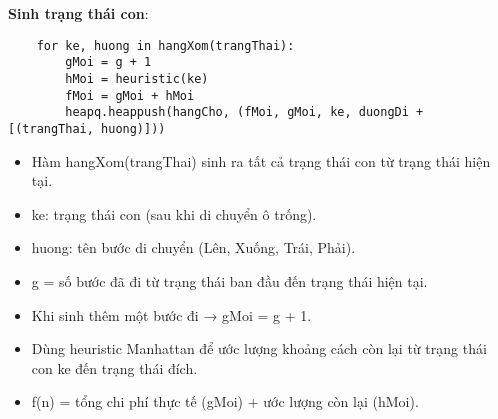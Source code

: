 \documentclass{article}
\begin{document}
\textbf{Sinh trạng thái con}:
\begin{verbatim}
    for ke, huong in hangXom(trangThai):
        gMoi = g + 1
        hMoi = heuristic(ke)
        fMoi = gMoi + hMoi
        heapq.heappush(hangCho, (fMoi, gMoi, ke, duongDi + [(trangThai, huong)]))
\end{verbatim}
\begin{itemize}
    \item Hàm hangXom(trangThai) sinh ra tất cả trạng thái con từ trạng thái hiện tại.
    \item ke: trạng thái con (sau khi di chuyển ô trống).
    \item huong: tên bước di chuyển (Lên, Xuống, Trái, Phải).
    \item g = số bước đã đi từ trạng thái ban đầu đến trạng thái hiện tại.
    \item Khi sinh thêm một bước đi → gMoi = g + 1.
    \item Dùng heuristic Manhattan để ước lượng khoảng cách còn lại từ trạng thái con ke đến trạng thái đích.
    \item f(n) = tổng chi phí thực tế (gMoi) + ước lượng còn lại (hMoi).

\end{itemize}
\end{document}
